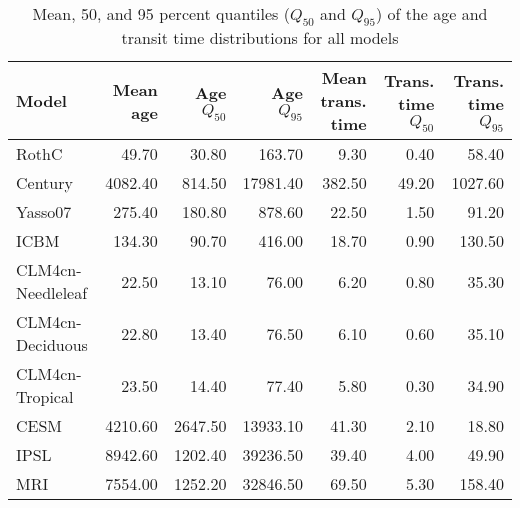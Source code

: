 \begin{table}[ht]
\centering
\caption{Mean, 50, and 95 percent quantiles ($Q_{50}$ and $Q_{95}$) of the age and transit time distributions for all models} 
\label{tab:Qs}
\begin{tabular}{lrrrrrr}
  \toprule
Model & Mean age & Age $Q_{50}$ & Age $Q_{95}$ & Mean trans. time & Trans. time $Q_{50}$ & Trans. time $Q_{95}$ \\ 
  \midrule
RothC & 49.70 & 30.80 & 163.70 & 9.30 & 0.40 & 58.40 \\ 
  Century & 4082.40 & 814.50 & 17981.40 & 382.50 & 49.20 & 1027.60 \\ 
  Yasso07 & 275.40 & 180.80 & 878.60 & 22.50 & 1.50 & 91.20 \\ 
  ICBM & 134.30 & 90.70 & 416.00 & 18.70 & 0.90 & 130.50 \\ 
  CLM4cn-Needleleaf & 22.50 & 13.10 & 76.00 & 6.20 & 0.80 & 35.30 \\ 
  CLM4cn-Deciduous & 22.80 & 13.40 & 76.50 & 6.10 & 0.60 & 35.10 \\ 
  CLM4cn-Tropical & 23.50 & 14.40 & 77.40 & 5.80 & 0.30 & 34.90 \\ 
  CESM & 4210.60 & 2647.50 & 13933.10 & 41.30 & 2.10 & 18.80 \\ 
  IPSL & 8942.60 & 1202.40 & 39236.50 & 39.40 & 4.00 & 49.90 \\ 
  MRI & 7554.00 & 1252.20 & 32846.50 & 69.50 & 5.30 & 158.40 \\ 
   \bottomrule
\end{tabular}
\end{table}
